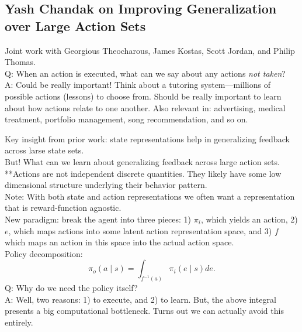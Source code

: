 \spacerule

\subsection{Yash Chandak on Improving Generalization over Large Action Sets}

Joint work with Georgious Theocharous, James Kostas, Scott Jordan, and Philip Thomas. \\

Q: When an action is executed, what can we say about any actions {\it not taken}? \\

A: Could be really important! Think about a tutoring system---millions of possible actions (lessons) to choose from. Should be really important to learn about how actions relate to one another. Also relevant in: advertising, medical treatment, portfolio management, song recommendation, and so on. \\


Key insight from prior work: state representations help in generalizing feedback across larse state sets. \\

But! What can we learn about generalizing feedback across large action sets. \\

**Actions are not independent discrete quantities. They likely have some low dimensional structure underlying their behavior pattern. \\

Note: With both state and action representations we often want a representation that is reward-function agnostic. \\

New paradigm: break the agent into three pieces: 1) $\pi_i$, which yields an action, 2) $e$, which maps actions into some latent action representation space, and 3) $f$ which maps an action in this space into the actual action space. \\

Policy decomposition:
\[
\pi_o(a \mid s) = \int_{f^{-1}(a)} \pi_i(e \mid s) de.
\]
Q: Why do we need the policy itself?\\

A: Well, two reasons: 1) to execute, and 2) to learn. But, the above integral presents a big computational bottleneck. Turns out we can actually avoid this entirely. \\

